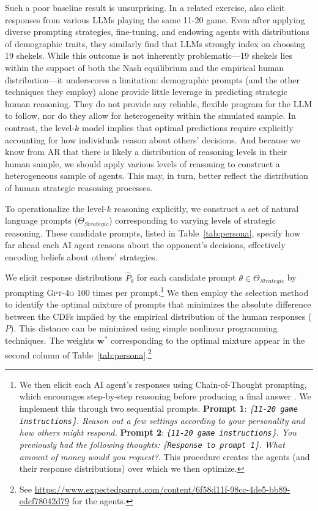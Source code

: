 \documentclass[11pt]{article}
\theoremstyle{definition}
\newcommand{\aisub}{AI agent}
\newcommand{\persona}{prompt}
\begin{document}
Such a poor baseline result is unsurprising.
In a related exercise, \cite{gao2024caution} also elicit responses from various LLMs playing the same 11-20 game.
Even after applying diverse prompting strategies, fine-tuning, and endowing agents with distributions of demographic traits, they similarly find that LLMs strongly index on choosing 19 shekels.
While this outcome is not inherently problematic---19 shekels lies within the support of both the Nash equilibrium and the empirical human distribution---it underscores a limitation: demographic prompts (and the other techniques they employ) alone provide little leverage in predicting strategic human reasoning.
They do not provide any reliable, flexible program for the LLM to follow, nor do they allow for heterogeneity within the simulated sample.
In contrast, the level-$k$ model implies that optimal predictions require explicitly accounting for how individuals reason about others' decisions.
And because we know from AR that there is likely a distribution of reasoning levels in their human sample, we should apply various levels of reasoning to construct a heterogeneous sample of agents.
This may, in turn, better reflect the distribution of human strategic reasoning processes.

To operationalize the level-$k$ reasoning explicitly, we construct a set of natural language \persona{s} ($\Theta_{Strategic}$) corresponding to varying levels of strategic reasoning.
These candidate \persona{s}, listed in Table~\ref{tab:persona}, specify how far ahead each \aisub{} reasons about the opponent's decisions, effectively encoding beliefs about others' strategies.

We elicit response distributions $\hat P_{\theta}$ for each candidate \persona{} $\theta \in \Theta_{Strategic}$ by prompting \textsc{Gpt-4o} 100 times per \persona{}.\footnote{We then elicit each \aisub{'s} responses using Chain-of-Thought prompting, which encourages step-by-step reasoning before producing a final answer \citep{weiCOT2024}. We implement this through two sequential prompts. \textbf{Prompt 1}: \emph{\{\texttt{11-20 game instructions}\}. Reason out a few settings according to your personality and how others might respond.} \textbf{Prompt 2}: \emph{\texttt{\{11-20 game instructions}\}. You previously had the following thoughts: \{\texttt{Response to prompt 1}\}. What amount of money would you request?}. This procedure creates the agents (and their response distributions) over which we then optimize.}
We then employ the selection method to identify the optimal mixture of \persona{s} that minimizes the absolute difference between the CDFs implied by the empirical distribution of the human responses ($P$).
This distance can be minimized using simple nonlinear programming techniques.
The weights $\mathbf{w}^*$ corresponding to the optimal mixture appear in the second column of Table~\ref{tab:persona}.\footnote{See \url{https://www.expectedparrot.com/content/6f58d11f-98cc-4de5-bb89-edcf78042d79} for the agents.}
\end{document}
